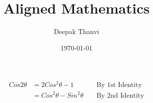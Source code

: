 \documentclass{article}
\title{Aligned Mathematics}
\author{Deepak Thanvi}
\date{\today}
\begin{document}
\maketitle

\begin{align}
Cos 2\theta & = 2Cos^2 \theta - 1 &&\text{ By 1st Identity} \\
		    & = Cos^2 \theta - Sin^2 \theta &&\text{ By 2nd Identity}
\end{align}
\end{document}
